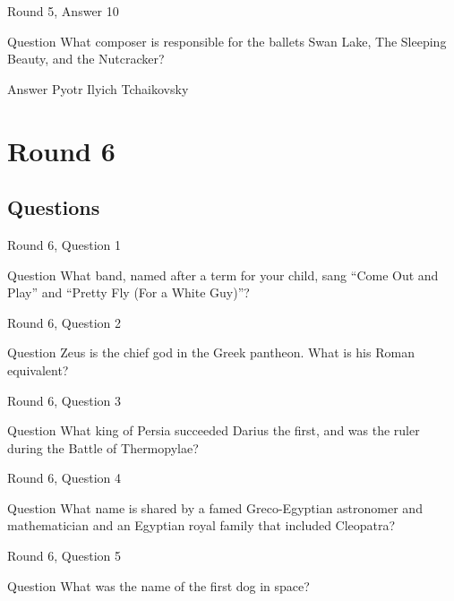 \documentclass[11pt]{beamer}
\begin{document}
\begin{frame}{Round 5, Answer 10}
\begin{block}{Question}
What composer is responsible for the ballets Swan Lake, The Sleeping Beauty, and the Nutcracker\@?
\end{block}
\pause{}
\begin{block}{Answer}
Pyotr Ilyich Tchaikovsky
\end{block}
\end{frame}
    

\section{Round 6}
    
\subsection{Questions}

\begin{frame}{Round 6, Question 1}
\begin{block}{Question}
What band, named after a term for your child, sang ``Come Out and Play'' and ``Pretty Fly (For a White Guy)''\@?
\end{block}
\end{frame}
    

\begin{frame}{Round 6, Question 2}
\begin{block}{Question}
Zeus is the chief god in the Greek pantheon. What is his Roman equivalent\@?
\end{block}
\end{frame}
    

\begin{frame}{Round 6, Question 3}
\begin{block}{Question}
What king of Persia succeeded Darius the first, and was the ruler during the Battle of Thermopylae\@?
\end{block}
\end{frame}
    

\begin{frame}{Round 6, Question 4}
\begin{block}{Question}
What name is shared by a famed Greco-Egyptian astronomer and mathematician and an Egyptian royal family that included Cleopatra\@?
\end{block}
\end{frame}
    

\begin{frame}{Round 6, Question 5}
\begin{block}{Question}
What was the name of the first dog in space\@?
\end{block}
\end{frame}
    
\end{document}
